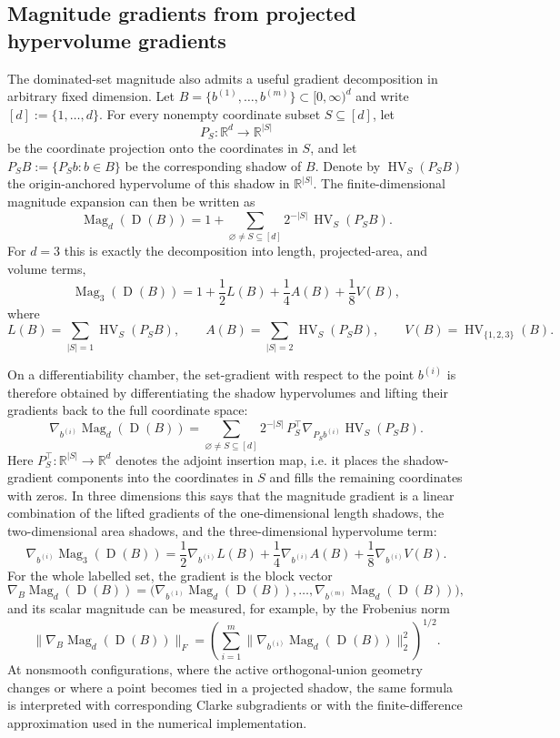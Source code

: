 \documentclass{article}
\newcommand{\Mag}{\operatorname{Mag}}
\newcommand{\HV}{\operatorname{HV}}
\newcommand{\R}{\mathbb{R}}
\newcommand{\Dom}{\operatorname{D}}
\begin{document}
\subsection{Magnitude gradients from projected hypervolume gradients}
\label{subsec:magnitude-gradient-projections}

The dominated-set magnitude also admits a useful gradient decomposition in arbitrary fixed dimension.  Let $B=\{b^{(1)},\dots,b^{(m)}\}\subset [0,\infty)^d$ and write $[d]:=\{1,\dots,d\}$.  For every nonempty coordinate subset $S\subseteq [d]$, let
\[
P_S:\R^d\to\R^{|S|}
\]
be the coordinate projection onto the coordinates in $S$, and let $P_S B:=\{P_S b:b\in B\}$ be the corresponding shadow of $B$.  Denote by $\HV_S(P_S B)$ the origin-anchored hypervolume of this shadow in $\R^{|S|}$.  The finite-dimensional magnitude expansion can then be written as
\[
\Mag_d(\Dom(B))
=
1+
\sum_{\varnothing\neq S\subseteq [d]}
2^{-|S|}\,\HV_S(P_S B).
\]
For $d=3$ this is exactly the decomposition into length, projected-area, and volume terms,
\[
\Mag_3(\Dom(B))
=
1+\frac12 L(B)+\frac14 A(B)+\frac18 V(B),
\]
where
\[
L(B)=\sum_{|S|=1}\HV_S(P_S B),
\qquad
A(B)=\sum_{|S|=2}\HV_S(P_S B),
\qquad
V(B)=\HV_{\{1,2,3\}}(B).
\]

On a differentiability chamber, the set-gradient with respect to the point $b^{(i)}$ is therefore obtained by differentiating the shadow hypervolumes and lifting their gradients back to the full coordinate space:
\[
\nabla_{b^{(i)}}\Mag_d(\Dom(B))
=
\sum_{\varnothing\neq S\subseteq [d]}
2^{-|S|}\,
P_S^{\top}
\nabla_{P_S b^{(i)}}\HV_S(P_S B).
\]
Here $P_S^{\top}:\R^{|S|}\to\R^d$ denotes the adjoint insertion map, i.e. it places the shadow-gradient components into the coordinates in $S$ and fills the remaining coordinates with zeros.  In three dimensions this says that the magnitude gradient is a linear combination of the lifted gradients of the one-dimensional length shadows, the two-dimensional area shadows, and the three-dimensional hypervolume term:
\[
\nabla_{b^{(i)}}\Mag_3(\Dom(B))
=
\frac12\nabla_{b^{(i)}}L(B)
+
\frac14\nabla_{b^{(i)}}A(B)
+
\frac18\nabla_{b^{(i)}}V(B).
\]
For the whole labelled set, the gradient is the block vector
\[
\nabla_B\Mag_d(\Dom(B))
=
\bigl(
\nabla_{b^{(1)}}\Mag_d(\Dom(B)),\dots,
\nabla_{b^{(m)}}\Mag_d(\Dom(B))
\bigr),
\]
and its scalar magnitude can be measured, for example, by the Frobenius norm
\[
\bigl\|\nabla_B\Mag_d(\Dom(B))\bigr\|_F
=
\left(
\sum_{i=1}^{m}
\bigl\|\nabla_{b^{(i)}}\Mag_d(\Dom(B))\bigr\|_2^2
\right)^{1/2}.
\]
At nonsmooth configurations, where the active orthogonal-union geometry changes or where a point becomes tied in a projected shadow, the same formula is interpreted with corresponding Clarke subgradients or with the finite-difference approximation used in the numerical implementation.
\end{document}

